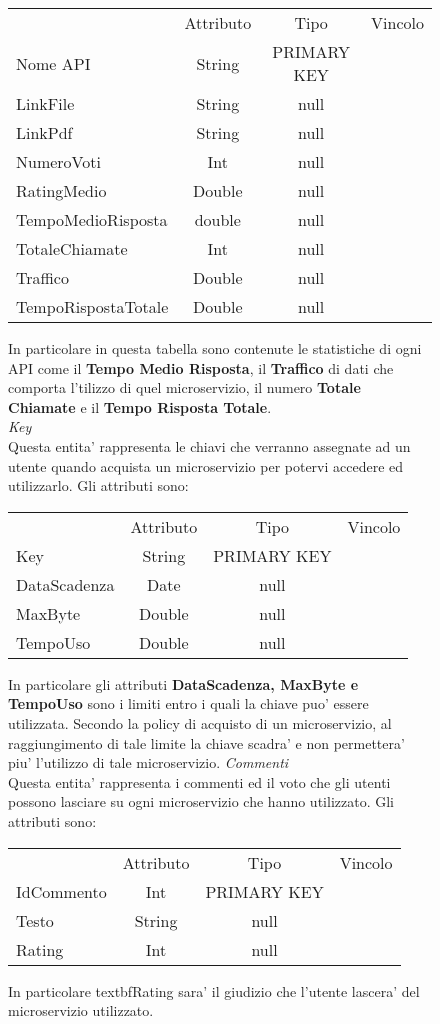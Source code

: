 {{\begin{figure}[ht]
			\begin{center}
			\begin{tabular}{lccc}
				&Attributo&Tipo&Vincolo\\
				Nome API&String&PRIMARY KEY\\
				LinkFile&String&null\\
				LinkPdf&String&null \\
				NumeroVoti&Int&null \\
				RatingMedio&Double&null \\
				TempoMedioRisposta&double&null \\
				TotaleChiamate&Int&null \\
				Traffico&Double&null \\
				TempoRispostaTotale&Double&null \\
			\end{tabular}
			\end{center}
			In particolare in questa tabella sono contenute le statistiche di ogni API come il \textbf{Tempo Medio Risposta}, il \textbf{Traffico} di dati che comporta l'tilizzo di quel microservizio, il numero \textbf{Totale Chiamate} e il \textbf{Tempo Risposta Totale}. \\
			\textit{Key}\\
			Questa entita' rappresenta le chiavi che verranno assegnate ad un utente quando acquista un microservizio per potervi accedere ed utilizzarlo. Gli attributi sono: \\
			\begin{center}
			\begin{tabular}{lccc}
				&Attributo&Tipo&Vincolo\\
				Key&String&PRIMARY KEY\\
				DataScadenza&Date&null \\
				MaxByte&Double&null \\
				TempoUso&Double&null \\
			\end{tabular}
			\end{center}
			In particolare gli attributi \textbf{DataScadenza, MaxByte e TempoUso} sono i limiti entro i quali la chiave puo' essere utilizzata. Secondo la policy di acquisto di un microservizio, al raggiungimento di tale limite la chiave scadra' e non permettera' piu' l'utilizzo di tale microservizio.
			\textit{Commenti}\\
			Questa entita' rappresenta i commenti ed il voto  che gli utenti possono lasciare su ogni microservizio che hanno utilizzato. Gli attributi sono:
			\begin{center}
			\begin{tabular}{lccc}
				&Attributo&Tipo&Vincolo\\
				IdCommento&Int&PRIMARY KEY\\
				Testo&String&null \\
				Rating&Int&null \\
			\end{tabular}
			\end{center}
			In particolare textbf{Rating} sara' il giudizio che l'utente lascera' del microservizio utilizzato. \\
			

\end{figure}}}
